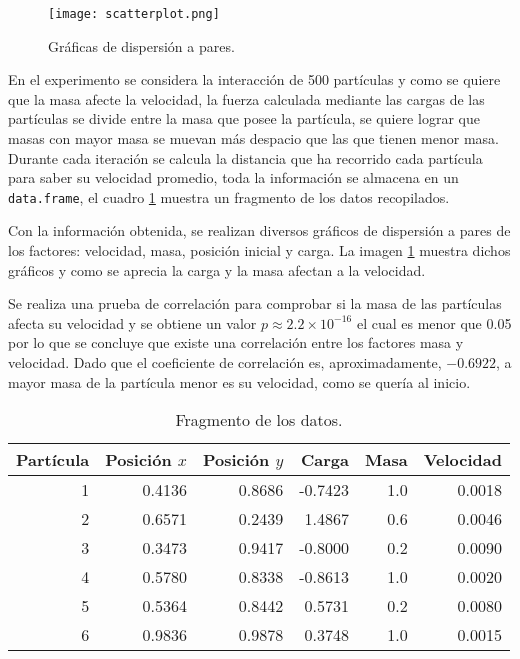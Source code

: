 \documentclass[12pt,letterpaper]{article}
\begin{document}
\begin{figure}
\centering
\texttt{[image: scatterplot.png]} 		
 		\caption{Gráficas de dispersión a pares.}
 		\label{4}
\end{figure}

En el experimento se considera la interacción de 500 partículas y como se quiere que la masa afecte la velocidad, la fuerza calculada mediante las cargas de las partículas se divide entre la masa que posee la partícula, se quiere lograr que masas con mayor masa se muevan más despacio que las que tienen menor masa. Durante cada iteración se calcula la distancia que ha recorrido cada partícula para saber su velocidad promedio, toda la información se almacena en un \texttt{data.frame}, el cuadro \ref{data} muestra un fragmento de los datos recopilados.

Con la información obtenida, se realizan diversos gráficos de dispersión a pares de los factores: velocidad, masa, posición inicial y carga. La imagen \ref{4} muestra dichos gráficos y como se aprecia la carga y la masa afectan a la velocidad.

Se realiza una prueba de correlación para comprobar si la masa de las partículas afecta su velocidad y se obtiene un valor $p \approx 2.2\times 10^{-16}$ el cual es menor que 0.05 por lo que se concluye que existe una correlación entre los factores masa y velocidad. Dado que el coeficiente de correlación es, aproximadamente, $-0.6922$, a mayor masa de la partícula menor es su velocidad, como se quería al inicio.
\begin{table}
\centering
\caption{Fragmento de los datos.}
\begin{tabular}{rrrrrr}
  \hline
Partícula & Posición $x$ & Posición $y$ & Carga & Masa &Velocidad\\ 
  \hline
1 & 0.4136 & 0.8686 & -0.7423 & 1.0 & 0.0018 \\ 
2 & 0.6571 & 0.2439 & 1.4867 & 0.6 & 0.0046 \\ 
3 & 0.3473 & 0.9417 & -0.8000 & 0.2 & 0.0090\\ 
4 & 0.5780 & 0.8338 & -0.8613 & 1.0 & 0.0020 \\
5 & 0.5364 & 0.8442 & 0.5731 & 0.2 & 0.0080 \\
6 & 0.9836 & 0.9878 & 0.3748 & 1.0 & 0.0015\\
\hline
\end{tabular}
\label{data}
\end{table}
 

\end{document}
